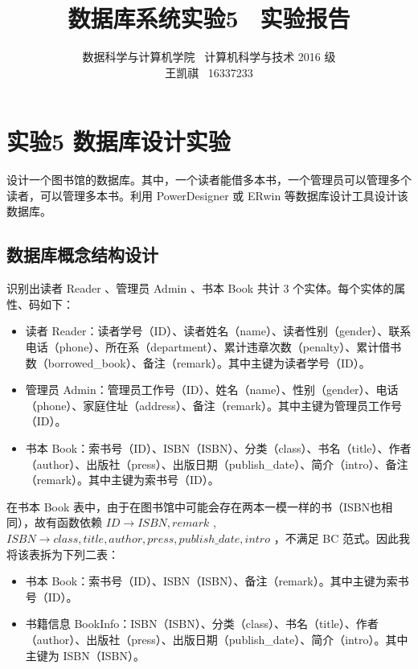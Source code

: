 \documentclass{article}
\begin{document}
\title{数据库系统实验5 \ 实验报告}
\author {数据科学与计算机学院 \ 计算机科学与技术 2016 级 \\ 王凯祺 \ 16337233}
\maketitle

\section{实验5 数据库设计实验}

设计一个图书馆的数据库。其中，一个读者能借多本书，一个管理员可以管理多个读者，可以管理多本书。利用 PowerDesigner 或 ERwin 等数据库设计工具设计该数据库。

\subsection{数据库概念结构设计}

识别出读者 Reader 、管理员 Admin 、书本 Book 共计 3 个实体。每个实体的属性、码如下：

\begin{itemize}
\item 读者 Reader：读者学号（ID）、读者姓名（name）、读者性别（gender）、联系电话（phone）、所在系（department）、累计违章次数（penalty）、累计借书数（borrowed\_book）、备注（remark）。其中主键为读者学号（ID）。
\item 管理员 Admin：管理员工作号（ID）、姓名（name）、性别（gender）、电话（phone）、家庭住址（address）、备注（remark）。其中主键为管理员工作号（ID）。
\item 书本 Book：索书号（ID）、ISBN（ISBN）、分类（class）、书名（title）、作者（author）、出版社（press）、出版日期（publish\_date）、简介（intro）、备注（remark）。其中主键为索书号（ID）。
\end{itemize}

在书本 Book 表中，由于在图书馆中可能会存在两本一模一样的书（ISBN也相同），故有函数依赖 $ID \rightarrow ISBN, remark$ , $ISBN \rightarrow class, title, author, press, publish\_date, intro$ ，不满足 BC 范式。因此我将该表拆为下列二表：

\begin{itemize}
\item 书本 Book：索书号（ID）、ISBN（ISBN）、备注（remark）。其中主键为索书号（ID）。
\item 书籍信息 BookInfo：ISBN（ISBN）、分类（class）、书名（title）、作者（author）、出版社（press）、出版日期（publish\_date）、简介（intro）。其中主键为 ISBN（ISBN）。
\end{itemize}
\end{document}
